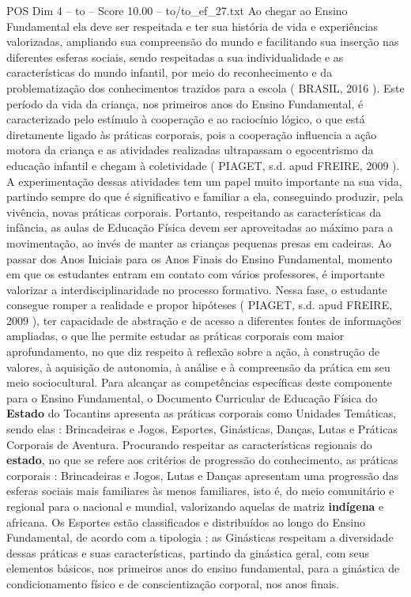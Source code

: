 \begin{textsample}{POS Dim 4 – to – Score 10.00 – to/to\_ef\_27.txt}
Ao chegar ao Ensino Fundamental ela deve ser respeitada e ter sua história de vida e experiências valorizadas, ampliando sua compreensão do mundo e facilitando sua inserção nas diferentes esferas sociais, sendo respeitadas a sua individualidade e as características do mundo infantil, por meio do reconhecimento e da problematização dos conhecimentos trazidos para a escola ( BRASIL, 2016 ).
Este período da vida da criança, nos primeiros anos do Ensino Fundamental, é caracterizado pelo estímulo à cooperação e ao raciocínio lógico, o que está diretamente ligado às práticas corporais, pois a cooperação influencia a ação motora da criança e as atividades realizadas ultrapassam o egocentrismo da educação infantil e chegam à coletividade ( PIAGET, s.d. apud FREIRE, 2009 ).
A experimentação dessas atividades tem um papel muito importante na sua vida, partindo sempre do que é significativo e familiar a ela, conseguindo produzir, pela vivência, novas práticas corporais.
Portanto, respeitando as características da infância, as aulas de Educação Física devem ser aproveitadas ao máximo para a movimentação, ao invés de manter as crianças pequenas presas em cadeiras.
Ao passar dos Anos Iniciais para os Anos Finais do Ensino Fundamental, momento em que os estudantes entram em contato com vários professores, é importante valorizar a interdisciplinaridade no processo formativo.
Nessa fase, o estudante consegue romper a realidade e propor hipóteses ( PIAGET, s.d. apud FREIRE, 2009 ), ter capacidade de abstração e de acesso a diferentes fontes de informações ampliadas, o que lhe permite estudar as práticas corporais com maior aprofundamento, no que diz respeito à reflexão sobre a ação, à construção de valores, à aquisição de autonomia, à análise e à compreensão da prática em seu meio sociocultural.
Para alcançar as competências específicas deste componente para o Ensino Fundamental, o Documento Curricular de Educação Física do \textbf{Estado} do Tocantins apresenta as práticas corporais como Unidades Temáticas, sendo elas : Brincadeiras e Jogos, Esportes, Ginásticas, Danças, Lutas e Práticas Corporais de Aventura.
Procurando respeitar as características regionais do \textbf{estado}, no que se refere aos critérios de progressão do conhecimento, as práticas corporais : Brincadeiras e Jogos, Lutas e Danças apresentam uma progressão das esferas sociais mais familiares às menos familiares, isto é, do meio comunitário e regional para o nacional e mundial, valorizando aquelas de matriz \textbf{indígena} e africana.
Os Esportes estão classificados e distribuídos ao longo do Ensino Fundamental, de acordo com a tipologia ; as Ginásticas respeitam a diversidade dessas práticas e suas características, partindo da ginástica geral, com seus elementos básicos, nos primeiros anos do ensino fundamental, para a ginástica de condicionamento físico e de conscientização corporal, nos anos finais.

\end{textsample}
